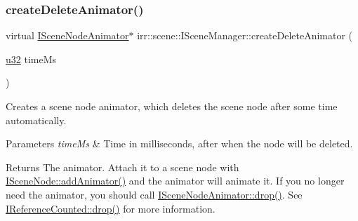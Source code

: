 \mbox{\label{classirr_1_1scene_1_1ISceneManager_a163cc04ff2cb03852ac891de56200fa3}} 
\subsubsection{\texorpdfstring{create\+Delete\+Animator()}{createDeleteAnimator()}}
{\footnotesize\ttfamily virtual \hyperlink{classirr_1_1scene_1_1ISceneNodeAnimator}{I\+Scene\+Node\+Animator}$\ast$ irr\+::scene\+::\+I\+Scene\+Manager\+::create\+Delete\+Animator (\begin{DoxyParamCaption}\item[{\hyperlink{namespaceirr_a0416a53257075833e7002efd0a18e804}{u32}}]{time\+Ms }\end{DoxyParamCaption})\hspace{0.3cm}{\ttfamily [pure virtual]}}



Creates a scene node animator, which deletes the scene node after some time automatically. 


\begin{DoxyParams}{Parameters}
{\em time\+Ms} & Time in milliseconds, after when the node will be deleted. \\
\hline
\end{DoxyParams}
\begin{DoxyReturn}{Returns}
The animator. Attach it to a scene node with \hyperlink{classirr_1_1scene_1_1ISceneNode_a0e5cd342cd7293c136e53e2c2c5e0f3a}{I\+Scene\+Node\+::add\+Animator()} and the animator will animate it. If you no longer need the animator, you should call \hyperlink{classirr_1_1IReferenceCounted_a03856a09355b89d178090c4a5f738543}{I\+Scene\+Node\+Animator\+::drop()}. See \hyperlink{classirr_1_1IReferenceCounted_a03856a09355b89d178090c4a5f738543}{I\+Reference\+Counted\+::drop()} for more information. 
\end{DoxyReturn}
\mbox{\label{classirr_1_1scene_1_1ISceneManager_a2e49ff49bc9e88e8ecf3d681354e1ab6}} 
